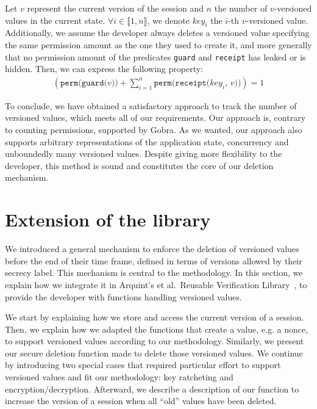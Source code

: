 \begin{lemma}\label{lem:sum-perm-eq-1}

    Let $v$ represent the current version of the session and $n$ the number of $v$-versioned values in the current state. $\forall i \in \llbracket 1, n \rrbracket$, we denote $key_i$ the $i$-th $v$-versioned value.
    Additionally, we assume the developer always deletes a versioned value specifying the same permission amount as the one they used to create it, and more generally that no permission amount of the predicates \texttt{guard} and \texttt{receipt} has leaked or is hidden.
    Then, we can express the following property:
    \begin{align*}
        \left(\texttt{perm(guard($v$))} + \sum_{i=1}^n \texttt{perm(receipt($key_i$, $v$))}\right) = 1
    \end{align*}

\end{lemma}

To conclude, we have obtained a satisfactory approach to track the number of versioned values, which meets all of our requirements.
Our approach is, contrary to counting permissions, supported by Gobra.
As we wanted, our approach also supports arbitrary representations of the application state, concurrency and unboundedly many versioned values.
Despite giving more flexibility to the developer, this method is sound and constitutes the core of our deletion mechanism.

\section{Extension of the library}
\label{sec:extension-of-the-library}

We introduced a general mechanism to enforce the deletion of versioned values before the end of their time frame, defined in terms of versions allowed by their secrecy label.
This mechanism is central to the methodology.
In this section, we explain how we integrate it in Arquint's et al.\ Reusable Verification Library~\cite{ArquintSchwerhoffMehtaMueller23}, to provide the developer with functions handling versioned values.

We start by explaining how we store and access the current version of a session.
Then, we explain how we adapted the functions that create a value, e.g. a nonce, to support versioned values according to our methodology.
Similarly, we present our secure deletion function made to delete those versioned values.
We continue by introducing two special cases that required particular effort to support versioned values and fit our methodology: key ratcheting and encryption/decryption. 
Afterward, we describe a description of our function to increase the version of a session when all “old” values have been deleted.


